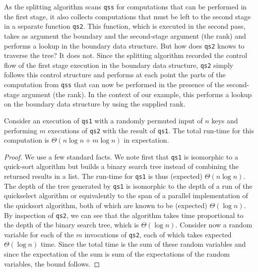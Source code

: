 \begin{abstrsyn}
As the splitting algorithm scans \texttt{qss} for computations that
can be performed in the first stage, it also collects computations
that must be left to the second stage in a separate function
\texttt{qs2}.  This function, which is executed in the second pass,
takes as argument the boundary and the second-stage argument (the
rank) and performs a lookup in the boundary data structure.  But how
does \texttt{qs2} knows to traverse the tree? It does not. Since
the splitting algorithm recorded the control flow of the first stage
execution in the boundary data structure, \texttt{qs2} simply follows
this control structure and performs at each point the parts of the
computation from \texttt{qss} that can now be performed in the
presence of the second-stage argument (the rank).  In the context of
our example, this performs a lookup on the boundary data structure by
using the supplied rank.

\begin{theorem}
  Consider an execution of \texttt{qs1} with a randomly permuted input
  of $n$ keys and performing $m$ executions of \texttt{qs2} with the
  result of \texttt{qs1}.  The total run-time for this computation is
  $\Theta(n\log{n} + m\log{n})$ in expectation.
\end{theorem}
\begin{proof}
  We use a few standard facts.  We note first that \texttt{qs1} is
  isomorphic to a quick-sort algorithm but builds a binary search tree
  instead of combining the returned results in a list.  The run-time
  for \texttt{qs1} is thus (expected) $\Theta(n\log{n})$.
%
  The depth of the tree generated by \texttt{qs1} is isomorphic to the
    depth of a run of the quickselect algorithm or equivalently to the
    span of a parallel implementation of the quicksort algorithm, both
    of which are known to be (expected) $\Theta(\log{n})$.
%
    By inspection of \texttt{qs2}, we can see that the algorithm takes
    time proportional to the depth of the binary search tree, which is
    $\Theta(\log{n})$. Consider now a random variable for each of the
    $m$ invocations of \texttt{qs2}, each of which takes expected
    $\Theta(\log{n})$ time.  Since the total time is the sum of these
    random variables and since the expectation of the sum is sum of
    the expectations of the random variables, the bound follows.
\end{proof}

\end{abstrsyn}
